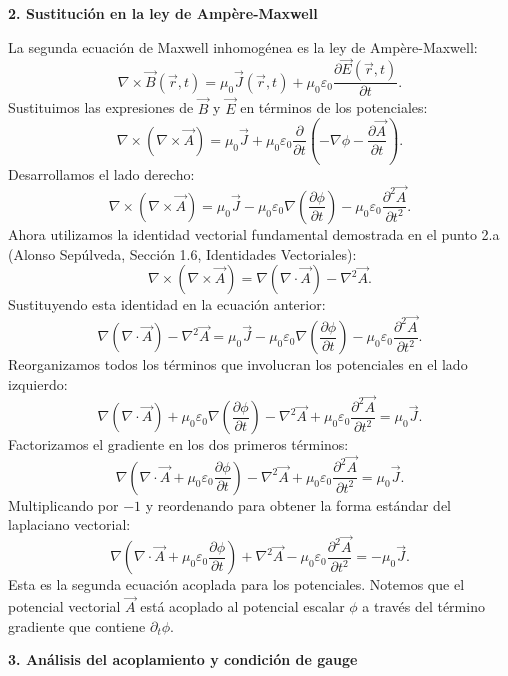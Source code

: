 \documentclass[a4paper]{article}
\begin{document}
\vspace{0.3cm}
\noindent\textbf{2. Sustitución en la ley de Ampère-Maxwell}

La segunda ecuación de Maxwell inhomogénea es la ley de Ampère-Maxwell:
$$
\nabla \times \vec{B}(\vec{r},t) = \mu_0 \vec{J}(\vec{r},t) + \mu_0\varepsilon_0 \frac{\partial \vec{E}(\vec{r},t)}{\partial t}.
$$
Sustituimos las expresiones de $\vec{B}$ y $\vec{E}$ en términos de los potenciales:
$$
\nabla \times (\nabla \times \vec{A}) = \mu_0 \vec{J} + \mu_0\varepsilon_0 \frac{\partial}{\partial t}\left(-\nabla\phi - \frac{\partial \vec{A}}{\partial t}\right).
$$
Desarrollamos el lado derecho:
$$
\nabla \times (\nabla \times \vec{A}) = \mu_0 \vec{J} - \mu_0\varepsilon_0 \nabla\left(\frac{\partial \phi}{\partial t}\right) - \mu_0\varepsilon_0 \frac{\partial^2 \vec{A}}{\partial t^2}.
$$
Ahora utilizamos la identidad vectorial fundamental demostrada en el punto 2.a (Alonso Sepúlveda, Sección 1.6, Identidades Vectoriales):
$$
\nabla \times (\nabla \times \vec{A}) = \nabla(\nabla \cdot \vec{A}) - \nabla^2 \vec{A}.
$$
Sustituyendo esta identidad en la ecuación anterior:
$$
\nabla(\nabla \cdot \vec{A}) - \nabla^2 \vec{A} = \mu_0 \vec{J} - \mu_0\varepsilon_0 \nabla\left(\frac{\partial \phi}{\partial t}\right) - \mu_0\varepsilon_0 \frac{\partial^2 \vec{A}}{\partial t^2}.
$$
Reorganizamos todos los términos que involucran los potenciales en el lado izquierdo:
$$
\nabla(\nabla \cdot \vec{A}) + \mu_0\varepsilon_0 \nabla\left(\frac{\partial \phi}{\partial t}\right) - \nabla^2 \vec{A} + \mu_0\varepsilon_0 \frac{\partial^2 \vec{A}}{\partial t^2} = \mu_0 \vec{J}.
$$
Factorizamos el gradiente en los dos primeros términos:
$$
\nabla\left(\nabla \cdot \vec{A} + \mu_0\varepsilon_0 \frac{\partial \phi}{\partial t}\right) - \nabla^2 \vec{A} + \mu_0\varepsilon_0 \frac{\partial^2 \vec{A}}{\partial t^2} = \mu_0 \vec{J}.
$$
Multiplicando por $-1$ y reordenando para obtener la forma estándar del laplaciano vectorial:
$$
\boxed{\nabla\left(\nabla \cdot \vec{A} + \mu_0\varepsilon_0\frac{\partial \phi}{\partial t}\right) + \nabla^2\vec{A} - \mu_0\varepsilon_0\frac{\partial^2 \vec{A}}{\partial t^2} = -\mu_0\vec{J}}.
$$
Esta es la segunda ecuación acoplada para los potenciales. Notemos que el potencial vectorial $\vec{A}$ está acoplado al potencial escalar $\phi$ a través del término gradiente que contiene $\partial_t \phi$.

\vspace{0.3cm}
\noindent\textbf{3. Análisis del acoplamiento y condición de gauge}
\end{document}
